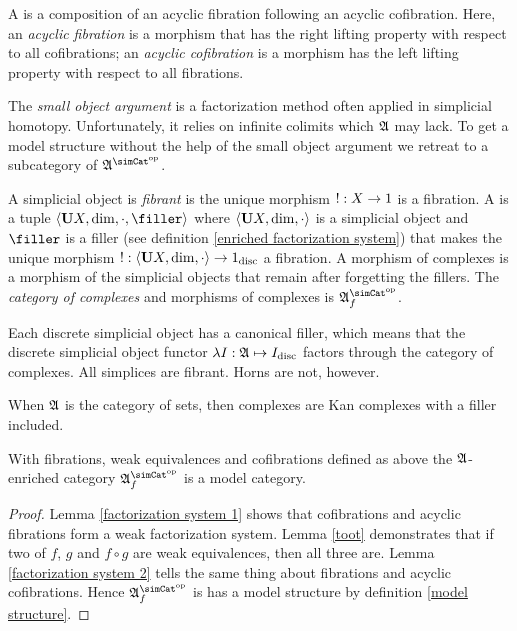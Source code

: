 \documentclass[csh.tex]{subfiles}
\begin{document}
\begin{definition} A  is a composition of an acyclic fibration following an acyclic cofibration. Here, an \emph{acyclic fibration} is a morphism that has the right lifting property with respect to all cofibrations; an \emph{acyclic cofibration} is a morphism has the left lifting property with respect to all fibrations.
\end{definition}

The \emph{small object argument} is a factorization method often applied in simplicial homotopy. Unfortunately, it relies on infinite colimits which $\mathfrak A$ may lack. To get a model structure without the help of the small object argument we retreat to a subcategory of $\ambient\s$.

\begin{definition} A simplicial object is \emph{fibrant} is the unique morphism $!: X\to 1$ is a fibration.
A  is a tuple $\tuplet{\base X,\dim,\cdot,\filler}$ where $\left\langle \mathbf{U} X,\dim,\cdot \right\rangle$ is a simplicial object and $\filler$ is a filler (see definition \ref{enriched factorization system}) that makes the unique morphism $!: \left\langle \mathbf{U} X,\dim,\cdot \right\rangle\to 1_{\rm disc}$ a fibration. A morphism of complexes is a morphism of the simplicial objects that remain after forgetting the fillers. The \emph{category of complexes} and morphisms of complexes is $\ambient\s\f$.
\end{definition}

\begin{example} Each discrete simplicial object has a canonical filler, which means that the discrete simplicial object functor $\lambda I:\mathfrak A \mapsto I_{\rm disc}$ factors through the category of complexes. All simplices are fibrant. Horns are not, however.
\end{example}

\begin{example} When $\mathfrak A$ is the category of sets, then complexes are Kan complexes with a filler included. \end{example}

\begin{theorem}
With fibrations, weak equivalences and cofibrations defined as above the $\mathfrak A$-enriched category $\ambient\s\f$ is a model category.
\label{model category}
\end{theorem}

\begin{proof}
Lemma \ref{factorization system 1} shows that cofibrations and acyclic fibrations form a weak factorization system. Lemma \ref{toot} demonstrates that if two of $f$, $g$ and $f\circ g$ are weak equivalences, then all three are. Lemma \ref{factorization system 2} tells the same thing about fibrations and acyclic cofibrations. Hence $\ambient\s\f$ is has a model structure by definition \ref{model structure}.
\end{proof}
\end{document}
